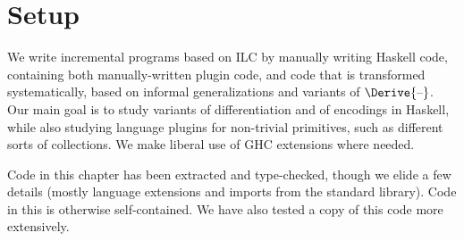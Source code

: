 

\section{Setup}
\label{sec:change-struct-tc}

We write incremental programs based on ILC by manually writing Haskell code,
containing both manually-written plugin code, and code that is transformed
systematically, based on informal generalizations and variants of
\ensuremath{\Derive{\text{\textendash}}}. Our main goal is to study variants of differentiation and of
encodings in Haskell, while also studying language plugins for non-trivial
primitives, such as different sorts of collections. We make liberal use of GHC
extensions where needed.

Code in this chapter has been extracted and type-checked, though we elide a few
details (mostly language extensions and imports from the standard library).
Code in this  is otherwise self-contained.
We have also tested a copy of this code more extensively.

